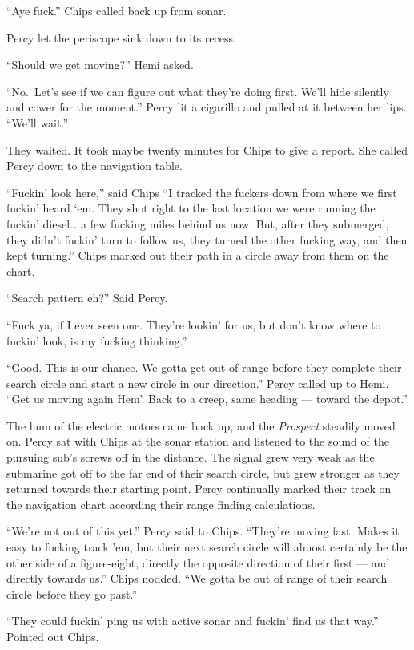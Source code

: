 \documentclass[
]{scrbook}
\begin{document}
``Aye fuck.'' Chips called back up from sonar.

Percy let the periscope sink down to its recess.

``Should we get moving?'' Hemi asked.

``No.~Let's see if we can figure out what they're doing first. We'll
hide silently and cower for the moment.'' Percy lit a cigarillo and
pulled at it between her lips. ``We'll wait.''

They waited. It took maybe twenty minutes for Chips to give a report.
She called Percy down to the navigation table.

``Fuckin' look here,'' said Chips ``I tracked the fuckers down from
where we first fuckin' heard `em. They shot right to the last location
we were running the fuckin' diesel\ldots{} a few fucking miles behind us
now. But, after they submerged, they didn't fuckin' turn to follow us,
they turned the other fucking way, and then kept turning.'' Chips marked
out their path in a circle away from them on the chart.

``Search pattern eh?'' Said Percy.

``Fuck ya, if I ever seen one. They're lookin' for us, but don't know
where to fuckin' look, is my fucking thinking.''

``Good. This is our chance. We gotta get out of range before they
complete their search circle and start a new circle in our direction.''
Percy called up to Hemi. ``Get us moving again Hem'. Back to a creep,
same heading --- toward the depot.''

The hum of the electric motors came back up, and the \emph{Prospect}
steadily moved on. Percy sat with Chips at the sonar station and
listened to the sound of the pursuing sub's screws off in the distance.
The signal grew very weak as the submarine got off to the far end of
their search circle, but grew stronger as they returned towards their
starting point. Percy continually marked their track on the navigation
chart according their range finding calculations.

``We're not out of this yet.'' Percy said to Chips. ``They're moving
fast. Makes it easy to fucking track 'em, but their next search circle
will almost certainly be the other side of a figure-eight, directly the
opposite direction of their first --- and directly towards us.'' Chips
nodded. ``We gotta be out of range of their search circle before they go
past.''

``They could fuckin' ping us with active sonar and fuckin' find us that
way.'' Pointed out Chips.
\end{document}
